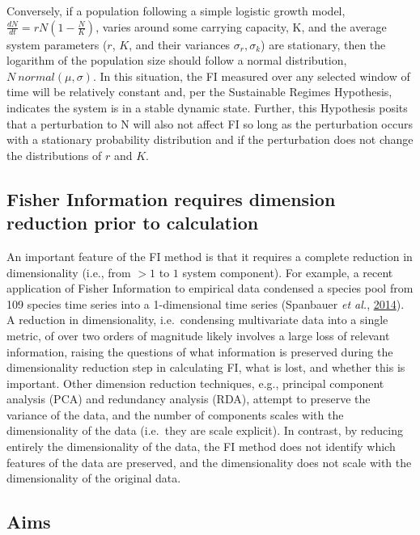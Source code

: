\documentclass[print]{nuthesis}
\begin{document}
Conversely, if a population following a simple logistic growth model, \(\frac{dN}{dt}=rN(1-\frac{N}{K})\), varies around some carrying capacity, K, and the average system parameters (\(r\), \(K\), and their variances \(\sigma_r, \sigma_k\)) are stationary, then the logarithm of the population size should follow a normal distribution, \(N ~ normal(\mu,\sigma)\). In this situation, the FI measured over any selected window of time will be relatively constant and, per the Sustainable Regimes Hypothesis, indicates the system is in a stable dynamic state. Further, this Hypothesis posits that a perturbation to N will also not affect FI so long as the perturbation occurs with a stationary probability distribution and if the perturbation does not change the distributions of \(r\) and \(K\).

\hypertarget{fisher-information-requires-dimension-reduction-prior-to-calculation}{%
\subsection{Fisher Information requires dimension reduction prior to calculation}\label{fisher-information-requires-dimension-reduction-prior-to-calculation}}

An important feature of the FI method is that it requires a complete reduction in dimensionality (i.e., from \(>1\) to \(1\) system component). For example, a recent application of Fisher Information to empirical data condensed a species pool from 109 species time series into a 1-dimensional time series (Spanbauer \emph{et al.}, \protect\hyperlink{ref-spanbauer_prolonged_2014}{2014}). A reduction in dimensionality, i.e.~condensing multivariate data into a single metric, of over two orders of magnitude likely involves a large loss of relevant information, raising the questions of what information is preserved during the dimensionality reduction step in calculating FI, what is lost, and whether this is important. Other dimension reduction techniques, e.g., principal component analysis (PCA) and redundancy analysis (RDA), attempt to preserve the variance of the data, and the number of components scales with the dimensionality of the data (i.e.~they are scale explicit). In contrast, by reducing entirely the dimensionality of the data, the FI method does not identify which features of the data are preserved, and the dimensionality does not scale with the dimensionality of the original data.

\hypertarget{aims}{%
\subsection{Aims}\label{aims}}
\end{document}
